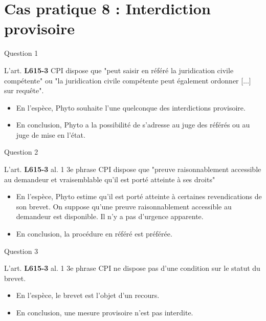 
\section[Cas 8]{Cas pratique 8 : Interdiction provisoire}

\begin{frame}{Question 1}

\begin{block}{}
L'art. \textbf{L615-3} CPI dispose que "peut saisir en référé
la juridication civile compétente" ou "la juridication civile
compétente peut également ordonner [...] sur requête".
\end{block}

\begin{itemize}
  \item En l'espèce, Phyto souhaite l'une quelconque des
  interdictions provisoire.
  \item En conclusion, Phyto a la possibilité de s'adresse
  au juge des référés ou au juge de mise en l'état.   
\end{itemize}

\end{frame}


\begin{frame}{Question 2}

\begin{block}{}
L'art. \textbf{L615-3} al. 1 3e phrase CPI dispose que
"preuve raisonnablement accessible au demandeur et
vraisemblable qu'il est porté atteinte à ses droits"
\end{block}

\begin{itemize}
  \item En l'espèce, Phyto estime qu'il est porté
  atteinte à certaines revendications de son brevet.
  On suppose qu'une preuve raisonnablement accessible
  au demandeur est disponible. Il n'y a pas d'urgence
  apparente.
  \item En conclusion, la procédure en référé est
  préférée.
\end{itemize}

\end{frame}

\begin{frame}{Question 3}

\begin{block}{}
L'art. \textbf{L615-3} al. 1 3e phrase CPI ne dispose pas
d'une condition sur le statut du brevet.
\end{block}

\begin{itemize}
  \item En l'espèce, le brevet est l'objet d'un recours.
  \item En conclusion, une mesure provisoire n'est pas
  interdite.
\end{itemize}

\end{frame}

